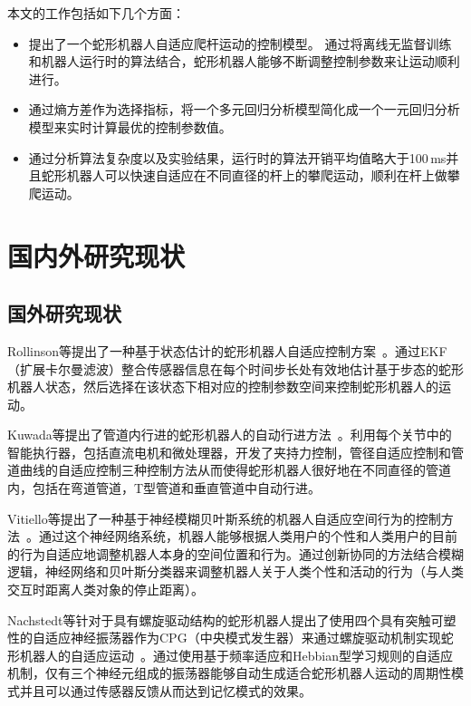 本文的工作包括如下几个方面：
\begin{itemize}
	\item 提出了一个蛇形机器人自适应爬杆运动的控制模型。 通过将离线无监督训练和机器人运行时的算法结合，蛇形机器人能够不断调整控制参数来让运动顺利进行。
	\item 通过熵方差作为选择指标，将一个多元回归分析模型简化成一个一元回归分析模型来实时计算最优的控制参数值。
	\item 通过分析算法复杂度以及实验结果，运行时的算法开销平均值略大于100\,ms并且蛇形机器人可以快速自适应在不同直径的杆上的攀爬运动，顺利在杆上做攀爬运动。
\end{itemize}

\section{国内外研究现状}
\label{sec:related_work}
\subsection{国外研究现状}
Rollinson等提出了一种基于状态估计的蛇形机器人自适应控制方案~\cite{GaitBasedCompliant}。通过EKF（扩展卡尔曼滤波）整合传感器信息在每个时间步长处有效地估计基于步态的蛇形机器人状态，然后选择在该状态下相对应的控制参数空间来控制蛇形机器人的运动。

Kuwada等提出了管道内行进的蛇形机器人的自动行进方法~\cite{Kuwada2008Automatic}。利用每个关节中的智能执行器，包括直流电机和微处理器，开发了夹持力控制，管径自适应控制和管道曲线的自适应控制三种控制方法从而使得蛇形机器人很好地在不同直径的管道内，包括在弯道管道，T型管道和垂直管道中自动行进。

Vitiello等提出了一种基于神经模糊贝叶斯系统的机器人自适应空间行为的控制方法~\cite{NeuroFuzzyBayesian}。通过这个神经网络系统，机器人能够根据人类用户的个性和人类用户的目前的行为自适应地调整机器人本身的空间位置和行为。通过创新协同的方法结合模糊逻辑，神经网络和贝叶斯分类器来调整机器人关于人类个性和活动的行为（与人类交互时距离人类对象的停止距离）。

Nachstedt等针对于具有螺旋驱动结构的蛇形机器人提出了使用四个具有突触可塑性的自适应神经振荡器作为CPG（中央模式发生器）来通过螺旋驱动机制实现蛇形机器人的自适应运动~\cite{Nachstedt2013Adaptive}。通过使用基于频率适应和Hebbian型学习规则的自适应机制，仅有三个神经元组成的振荡器能够自动生成适合蛇形机器人运动的周期性模式并且可以通过传感器反馈从而达到记忆模式的效果。

